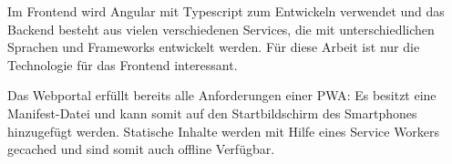 

Im Frontend wird Angular mit Typescript zum Entwickeln verwendet und das Backend besteht aus vielen verschiedenen Services, die mit unterschiedlichen Sprachen und Frameworks entwickelt werden. Für diese Arbeit ist nur die Technologie für das Frontend interessant. 

Das Webportal erfüllt bereits alle Anforderungen einer \ac{PWA}: Es besitzt eine Manifest-Datei und kann somit auf den Startbildschirm des Smartphones hinzugefügt werden. Statische Inhalte werden mit Hilfe eines Service Workers gecached und sind somit auch offline Verfügbar. 
